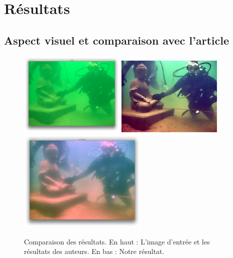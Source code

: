 \documentclass[twoside]{article}
\begin{document}
\section{Résultats}
\subsection{Aspect visuel et comparaison avec l'article}

\begin{figure}[H]
  \centering
  \includegraphics[width=0.45\textwidth]{Support/input.png}
  \includegraphics[width=0.45\textwidth]{Support/theirs.png}
  \includegraphics[width=0.55\textwidth]{Support/ours.png}
  \caption{Comparaison des résultats. En haut : L'image d'entrée et les résultats des auteurs. En bas : Notre résultat.}
\end{figure}
\end{document}

